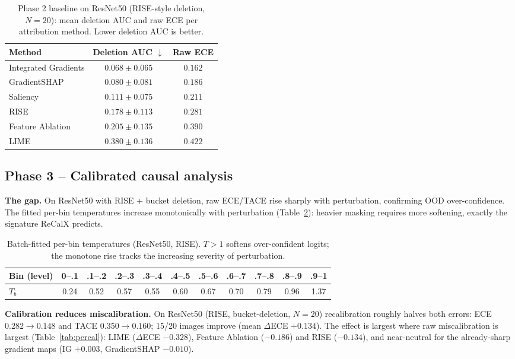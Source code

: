 \documentclass[11pt]{article}
\begin{document}
\begin{table}[H]
\centering\small
\caption{Phase 2 baseline on ResNet50 (RISE-style deletion, $N{=}20$): mean
deletion AUC and raw ECE per attribution method. Lower deletion AUC is better.}
\label{tab:baseline}
\begin{tabular}{lcc}
\toprule
Method & Deletion AUC $\downarrow$ & Raw ECE \\
\midrule
Integrated Gradients & $0.068 \pm 0.065$ & $0.162$ \\
GradientSHAP         & $0.080 \pm 0.081$ & $0.186$ \\
Saliency             & $0.111 \pm 0.075$ & $0.211$ \\
RISE                 & $0.178 \pm 0.113$ & $0.281$ \\
Feature Ablation     & $0.205 \pm 0.135$ & $0.390$ \\
LIME                 & $0.380 \pm 0.136$ & $0.422$ \\
\bottomrule
\end{tabular}
\end{table}

\subsection{Phase 3 -- Calibrated causal analysis}
\textbf{The gap.} On ResNet50 with RISE + bucket deletion, raw ECE/TACE rise
sharply with perturbation, confirming OOD over-confidence. The fitted per-bin
temperatures increase monotonically with perturbation
(Table~\ref{tab:temps}): heavier masking requires more softening, exactly the
signature ReCalX predicts.

\begin{table}[H]
\centering\small
\caption{Batch-fitted per-bin temperatures (ResNet50, RISE). $T>1$ softens
over-confident logits; the monotone rise tracks the increasing severity of
perturbation.}
\label{tab:temps}
\begin{tabular}{lcccccccccc}
\toprule
Bin (level) & 0--.1 & .1--.2 & .2--.3 & .3--.4 & .4--.5 & .5--.6 & .6--.7 & .7--.8 & .8--.9 & .9--1 \\
\midrule
$T_b$ & 0.24 & 0.52 & 0.57 & 0.55 & 0.60 & 0.67 & 0.70 & 0.79 & 0.96 & 1.37 \\
\bottomrule
\end{tabular}
\end{table}

\textbf{Calibration reduces miscalibration.} On ResNet50 (RISE,
bucket-deletion, $N{=}20$) recalibration roughly halves both errors:
ECE $0.282\!\to\!0.148$ and TACE $0.350\!\to\!0.160$; 15/20 images improve
(mean $\Delta$ECE $+0.134$). The effect is largest where raw miscalibration is
largest (Table~\ref{tab:percal}): LIME ($\Delta$ECE $-0.328$), Feature Ablation
($-0.186$) and RISE ($-0.134$), and near-neutral for the already-sharp gradient
maps (IG $+0.003$, GradientSHAP $-0.010$).
\end{document}
